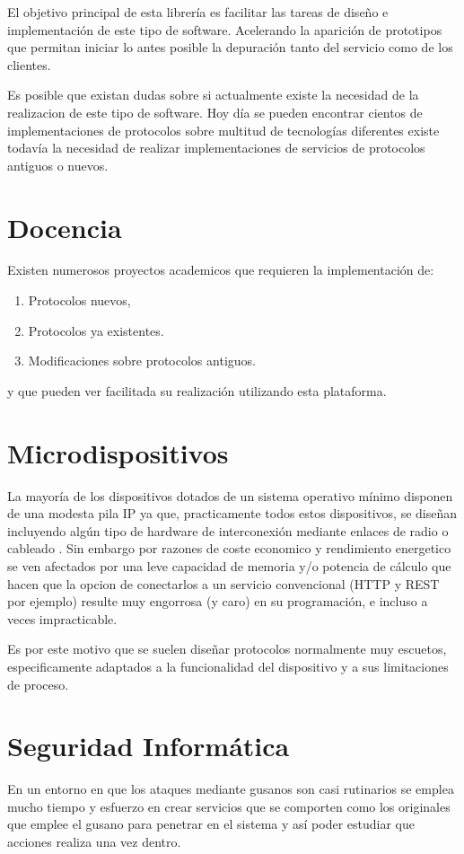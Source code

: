 \documentclass[a4paper,spanish,12pt]{book}
\begin{document}
El objetivo principal de esta librería es facilitar las tareas de diseño e implementación de este tipo de software. Acelerando la aparición de prototipos que permitan iniciar lo antes posible la depuración tanto del servicio como de los clientes.

Es posible que existan dudas sobre si actualmente existe la necesidad de la realizacion de este tipo de software. Hoy día se pueden encontrar cientos de implementaciones de protocolos sobre multitud de tecnologías diferentes existe todavía la necesidad de realizar implementaciones de servicios de protocolos antiguos o nuevos.

\section{Docencia}
Existen numerosos proyectos academicos que requieren la implementaci\'on de:
\begin{enumerate}
	\item Protocolos nuevos,
	\item Protocolos ya existentes.
	\item Modificaciones sobre protocolos antiguos. 
\end{enumerate}

y que pueden ver facilitada su realización utilizando esta plataforma.

\section{Microdispositivos}
La mayor\'ia de los dispositivos dotados de un sistema operativo m\'inimo disponen de una modesta pila IP ya que, practicamente todos estos dispositivos, se dise\~{n}an incluyendo algún tipo de hardware de interconexi\'on mediante enlaces de radio o cableado . Sin embargo por razones de coste economico y rendimiento energetico se ven afectados por una leve capacidad de memoria y/o potencia de c\'alculo que hacen que la opcion de conectarlos a un servicio convencional (HTTP y REST por ejemplo) resulte muy engorrosa (y caro) en su programaci\'on, e incluso a veces impracticable.

Es por este motivo que se suelen dise\~{n}ar protocolos normalmente muy escuetos, especificamente adaptados a la funcionalidad del dispositivo y a sus limitaciones de proceso.

\section{Seguridad Inform\'atica}
En un entorno en que los ataques mediante gusanos son casi rutinarios se emplea mucho tiempo y esfuerzo en crear servicios que se comporten como los originales que emplee el gusano para penetrar en el sistema y as\'i poder estudiar que acciones realiza una vez dentro.
\end{document}
